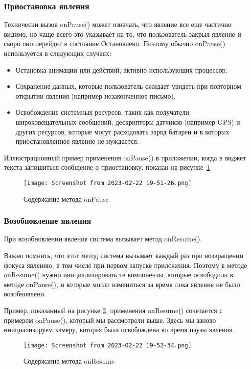 \subsubsection{Приостановка явления}
Технически вызов onPause() может означать, что явление все еще частично
видимо, но чаще всего это указывает на то, что пользователь закрыл явление 
и скоро оно перейдет в состояние Остановлено. Поэтому обычно onPause()
используется в следующих случаях:
\begin{itemize}
	\item Остановка анимации или действий, активно использующих процессор.
	\item Сохранение данных, которые пользователь ожидает увидеть при
		повторном открытии явления (например незаконченное письмо).
	\item Освобождение системных ресурсов, таких как получатели
		широковещательных сообщений, дескрипторы датчиков (например GPS)
		и других ресурсов, которые могут расходовать заряд батареи
		и в которых приостановленное явление не нуждается.
\end{itemize}
Иллюстрационный пример применения onPause() в приложении,
когда в виджет текста запишиться сообщение о приостановку, показан
на рисунке~\ref{fig:activity:onPause:content}
\begin{figure}[h!tp]
	\centering
	\texttt{[image: Screenshot from 2023-02-22 19-51-26.png]}
	\caption{Содержание метода onPause}
	\label{fig:activity:onPause:content}
\end{figure}

\subsubsection{Возобновление явления}
При возобновлении явления система вызывает метод onResume().\par
Важно помнить, что этот метод система вызывает каждый раз при
возвращении фокуса явлению, в том числе при первом запуске приложения.
Поэтому в методе onResume() нужно инициализировать те компоненты,
которые освободили в методе onPause(), и которые могли измениться за
время пока явление не было возобновлено.\par
Пример, показанный на рисунке \ref{fig:activity:onResume:content}, применения
onResume() сочетается с примером onPause(), который мы рассмотрели выше.
Здесь мы заново инициализируем камеру, которая была освобождена во время
паузы явления.
\begin{figure}[h!tp]
	\centering
	\texttt{[image: Screenshot from 2023-02-22 19-52-34.png]}
	\caption{Содержание метода onResume}
	\label{fig:activity:onResume:content}
\end{figure}

